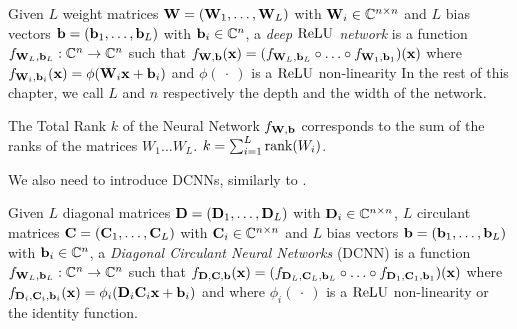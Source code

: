 \begin{definition} \label{definition:deep_relu_network}
Given $L$ weight matrices $\mathbf{W} = (\mathbf{W}_1, \ldots, \mathbf{W}_L)$ with $\mathbf{W}_i \in {\ensuremath \mathbb{C}}^{n \times n}$ and  $L$ bias vectors $\mathbf{b} = (\mathbf{b}_1, \ldots, \mathbf{b}_L)$  with  $\mathbf{b}_i \in {\ensuremath \mathbb{C}}^{n}$, a \emph{deep $\operatorname{ReLU}$ network} is a function $f_{\mathbf{W}_L, \mathbf{b}_L} : {\mathbb{C}}^{n} \rightarrow {\ensuremath \mathbb{C}}^{n}$ such that $f_{\mathbf{W}, \mathbf{b}}(\mathbf{x}) =  (f_{\mathbf{W}_L, \mathbf{b}_L} \circ \ldots \circ f_{\mathbf{W}_1, \mathbf{b}_1})(\mathbf{x})$ where $f_{\mathbf{W}_i, \mathbf{b}_i}(\mathbf{x}) = \phi(\mathbf{W}_i \mathbf{x} + \mathbf{b}_i)$ and $\phi(\ \cdot\ )$ is a $\operatorname{ReLU}$ non-linearity 
In the rest of this chapter, we call $L$ and $n$ respectively the depth and the width of the network.
\end{definition}

\begin{definition}
  The Total Rank $k$ of the Neural Network $f_{\mathbf{W}, \mathbf{b}}$ corresponds to the sum of the ranks of the matrices $W_{1}\ldots W_{L}$. \ie $k = \sum_{i=1}^L \rank(W_i)$.
\end{definition}


We also need to introduce DCNNs, similarly to \citet{moczulski2015acdc}.

\begin{definition} \label{definition:DCNN}
Given $L$ diagonal matrices $\mathbf{D} = (\mathbf{D}_1, \ldots, \mathbf{D}_L)$ with $\mathbf{D}_i \in {\ensuremath \mathbb{C}}^{n \times n}$, $L$ circulant matrices $\mathbf{C} = (\mathbf{C}_1, \ldots, \mathbf{C}_L)$ with $\mathbf{C}_i \in {\ensuremath \mathbb{C}}^{n \times n}$ and $L$ bias vectors $\mathbf{b} = (\mathbf{b}_1, \ldots, \mathbf{b}_L)$ with  $\mathbf{b}_i \in {\ensuremath \mathbb{C}}^{n}$, a \emph{Diagonal Circulant Neural Networks} (DCNN) is a function $f_{\mathbf{W}_L, \mathbf{b}_L} : {\mathbb{C}}^{n} \rightarrow {\ensuremath \mathbb{C}}^{n}$ such that $f_{\mathbf{D},\mathbf{C},\mathbf{b}}(\mathbf{x}) = (f_{\mathbf{D}_L, \mathbf{C}_L, \mathbf{b}_L} \circ \ldots \circ f_{\mathbf{D}_1, \mathbf{C}_1, \mathbf{b}_1})(\mathbf{x})$ where $f_{\mathbf{D}_i, \mathbf{C}_i, \mathbf{b}_i}(\mathbf{x}) = \phi_i (\mathbf{D}_i \mathbf{C}_i \mathbf{x} + \mathbf{b}_i)$ and where $\phi_i(\ \cdot\ )$ is a $\operatorname{ReLU}$ non-linearity or the identity function.
\end{definition}

